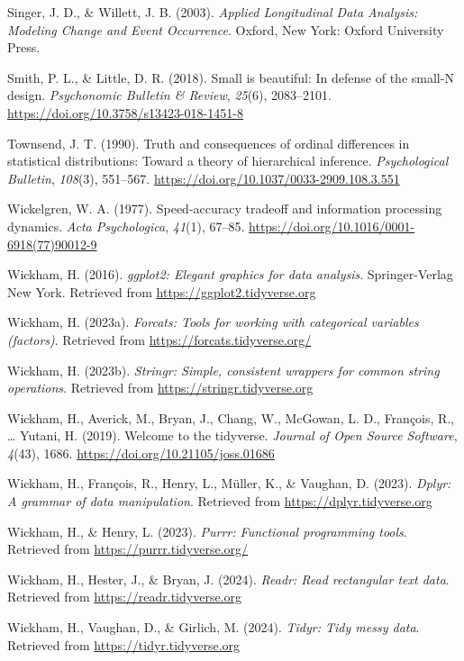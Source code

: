 \documentclass[
  man,floatsintext]{apa6}
\newlength{\cslhangindent}
\newenvironment{CSLReferences}[2] %
 {\begin{list}{}{%
  \setlength{\itemindent}{0pt}
  \setlength{\leftmargin}{0pt}
  \setlength{\parsep}{0pt}
  \ifodd #1
   \setlength{\leftmargin}{\cslhangindent}
   \setlength{\itemindent}{-1\cslhangindent}
  \fi
  \setlength{\itemsep}{#2\baselineskip}}}
 {\end{list}}
\begin{document}
\begin{CSLReferences}{1}{0}
Singer, J. D., \& Willett, J. B. (2003). \emph{Applied {Longitudinal Data Analysis}: {Modeling Change} and {Event Occurrence}}. Oxford, New York: Oxford University Press.

Smith, P. L., \& Little, D. R. (2018). Small is beautiful: {In} defense of the small-{N} design. \emph{Psychonomic Bulletin \& Review}, \emph{25}(6), 2083--2101. \url{https://doi.org/10.3758/s13423-018-1451-8}

Townsend, J. T. (1990). Truth and consequences of ordinal differences in statistical distributions: {Toward} a theory of hierarchical inference. \emph{Psychological Bulletin}, \emph{108}(3), 551--567. \url{https://doi.org/10.1037/0033-2909.108.3.551}

Wickelgren, W. A. (1977). Speed-accuracy tradeoff and information processing dynamics. \emph{Acta Psychologica}, \emph{41}(1), 67--85. \url{https://doi.org/10.1016/0001-6918(77)90012-9}

Wickham, H. (2016). \emph{ggplot2: Elegant graphics for data analysis}. Springer-Verlag New York. Retrieved from \url{https://ggplot2.tidyverse.org}

Wickham, H. (2023a). \emph{Forcats: Tools for working with categorical variables (factors)}. Retrieved from \url{https://forcats.tidyverse.org/}

Wickham, H. (2023b). \emph{Stringr: Simple, consistent wrappers for common string operations}. Retrieved from \url{https://stringr.tidyverse.org}

Wickham, H., Averick, M., Bryan, J., Chang, W., McGowan, L. D., François, R., \ldots{} Yutani, H. (2019). Welcome to the {tidyverse}. \emph{Journal of Open Source Software}, \emph{4}(43), 1686. \url{https://doi.org/10.21105/joss.01686}

Wickham, H., François, R., Henry, L., Müller, K., \& Vaughan, D. (2023). \emph{Dplyr: A grammar of data manipulation}. Retrieved from \url{https://dplyr.tidyverse.org}

Wickham, H., \& Henry, L. (2023). \emph{Purrr: Functional programming tools}. Retrieved from \url{https://purrr.tidyverse.org/}

Wickham, H., Hester, J., \& Bryan, J. (2024). \emph{Readr: Read rectangular text data}. Retrieved from \url{https://readr.tidyverse.org}

Wickham, H., Vaughan, D., \& Girlich, M. (2024). \emph{Tidyr: Tidy messy data}. Retrieved from \url{https://tidyr.tidyverse.org}

\end{CSLReferences}
\end{document}
